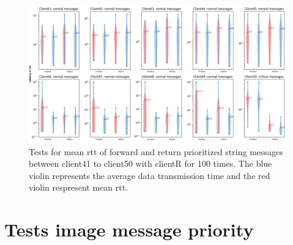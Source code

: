 \begin{figure}
    \includegraphics[width=\textheight]{figures/appendix/priority_tests/log_violin_50clients_string_figure_5.png}\hfill 
    \caption{Tests for mean \gls{rtt} of forward and return prioritized string messages between client41 to client50 
    with clientR for 100 times. The blue violin represents the average data transmission time and the red violin 
    respresent mean \gls{rtt}.} \label{fig: priority-50clients-string-e}
\end{figure}


\newpage
\section{Tests image message priority}\label{chap: append-image-priority}


